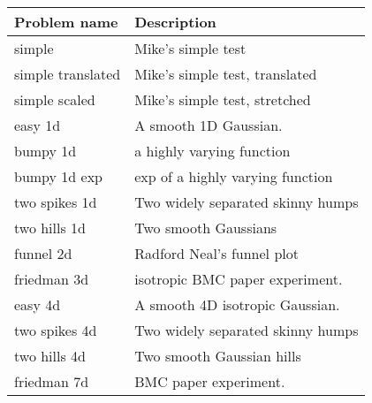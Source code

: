 \begin{table}[h!]
\label{tbl:problem_descriptions}
\begin{center}
\begin{tabular}{ll}
 Problem name & Description \ 
 \\ \midrule 
simple & Mike's simple test \\ 
simple translated & Mike's simple test, translated \\ 
simple scaled & Mike's simple test, stretched \\ 
easy 1d & A smooth 1D Gaussian. \\ 
bumpy 1d & a highly varying function \\ 
bumpy 1d exp & exp of a highly varying function \\ 
two spikes 1d & Two widely separated skinny humps \\ 
two hills 1d & Two smooth Gaussians \\ 
funnel 2d & Radford Neal's funnel plot \\ 
friedman 3d & isotropic BMC paper experiment. \\ 
easy 4d & A smooth 4D isotropic Gaussian. \\ 
two spikes 4d & Two widely separated skinny humps \\ 
two hills 4d & Two smooth Gaussian hills \\ 
friedman 7d & BMC paper experiment. \\ 
\end{tabular}
\end{center}
\end{table}
